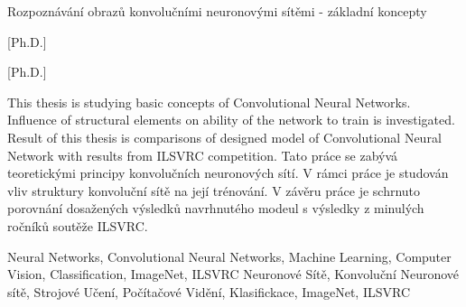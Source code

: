 {Rozpoznávání obrazů konvolučními neuronovými sítěmi - základní koncepty}

[Ph.D.]

[Ph.D.]







\abstrakt
{This thesis is studying basic concepts of Convolutional Neural Networks. Influence of structural elements on ability of the network to train is investigated. Result of this thesis is comparisons of designed model of Convolutional Neural Network with results from ILSVRC competition.}
{Tato práce se zabývá teoretickými principy konvolučních neuronových sítí. V rámci práce je studován vliv struktury konvoluční sítě na její trénování. V závěru práce je schrnuto porovnání dosažených výsledků navrhnutého modeul s výsledky z minulých ročníků soutěže ILSVRC.}

\klicovaslova
{Neural Networks, Convolutional Neural Networks, Machine Learning, Computer Vision, Classification, ImageNet, ILSVRC}%
{Neuronové Sítě, Konvoluční Neuronové sítě, Strojové Učení, Počítačové Vidění, Klasifickace,  ImageNet, ILSVRC}%

